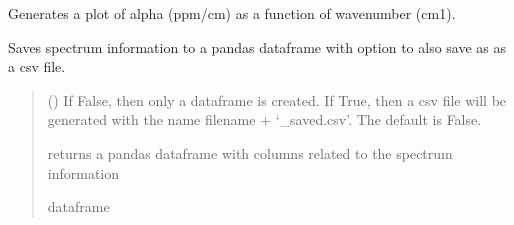 \documentclass[letterpaper,10pt,english]{sphinxmanual}
\begin{document}
\begin{fulllineitems}
\begin{fulllineitems}
\end{fulllineitems}


\begin{fulllineitems}
\label{\detokenize{MATS:MATS.spectrum.Spectrum.plot_wave_alpha}}
\pysigstartsignatures
{}
\pysigstopsignatures
\sphinxAtStartPar
Generates a plot of alpha (ppm/cm) as a function of wavenumber (cm\sphinxhyphen{}1).

\end{fulllineitems}


\begin{fulllineitems}
\label{\detokenize{MATS:MATS.spectrum.Spectrum.save_spectrum_info}}
\pysigstartsignatures
{}
\pysigstopsignatures
\sphinxAtStartPar
Saves spectrum information to a pandas dataframe with option to also save as as a csv file.
\begin{quote}\begin{description}
\sphinxAtStartPar
{} (\sphinxstyleliteralemphasis{\sphinxupquote{, }}) \textendash{} If False, then only a dataframe is created. If True, then a csv file will be generated with the name filename + ‘\_saved.csv’. The default is False.

\sphinxAtStartPar
{} \textendash{} returns a pandas dataframe with columns related to the spectrum information

\sphinxAtStartPar
dataframe

\end{description}\end{quote}

\end{fulllineitems}



\end{fulllineitems}
\end{document}
